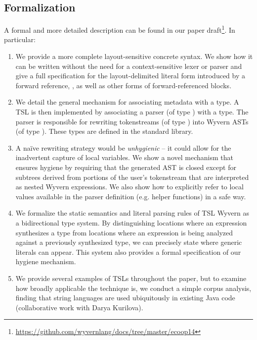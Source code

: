 {{\subsection{Formalization}
A formal and more detailed description can be found in our paper draft\footnote{\url{https://github.com/wyvernlang/docs/tree/master/ecoop14}}. In particular:
\begin{enumerate}
\item We provide a more complete layout-sensitive concrete syntax. We show how it can be written without the need for a context-sensitive lexer or parser and give a full specification for the layout-delimited literal form introduced by a forward reference, \li{~}, as well as other forms of forward-referenced blocks.
\item We detail the general mechanism for associating metadata with a type. A TSL is then implemented by associating a parser (of type ) with a type. The parser is responsible for rewriting tokenstreams (of type ) into Wyvern ASTs (of type ). These types are defined in the standard library.
\item A na\"ive rewriting strategy would be \emph{unhygienic} -- it could allow for the inadvertent capture of local variables. We show a novel mechanism that ensures hygiene by requiring that the generated AST is closed except for subtrees derived from portions of the user's tokenstream that are interpreted as nested Wyvern expressions. We also show how to explicitly refer to local values available in the parser definition (e.g. helper functions) in a safe way. 
\item We formalize the static semantics and literal parsing rules of TSL Wyvern as a bidirectional type system. By distinguishing locations where an expression synthesizes a type from locations where an expression is being analyzed against a previously synthesized type, we can precisely state where generic literals can appear. This system also provides a formal specification of our hygiene mechanism.
\item We provide several examples of TSLs throughout the paper, but to examine how broadly applicable the technique is, we conduct a simple corpus analysis, finding that string languages are used ubiquitously in existing Java code  (collaborative work with Darya Kurilova).
\end{enumerate}

}}
